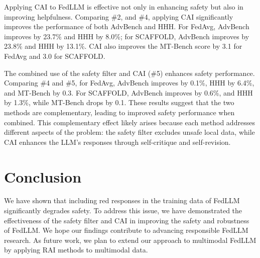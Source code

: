 Applying CAI to FedLLM is effective not only in enhancing safety but also in improving helpfulness.  
Comparing \#2, and \#4, applying CAI significantly improves the performance of both AdvBench and HHH.  
For FedAvg, AdvBench improves by 23.7\% and HHH by 8.0\%; for SCAFFOLD, AdvBench improves by 23.8\% and HHH by 13.1\%. 
CAI also improves the MT-Bench score by 3.1 for FedAvg and 3.0 for SCAFFOLD.


The combined use of the safety filter and CAI (\#5) enhances safety performance.  
Comparing \#4 and \#5, for FedAvg, AdvBench improves by 0.1\%, HHH by 6.4\%, and MT-Bench by 0.3.  
For SCAFFOLD, AdvBench improves by 0.6\%, and HHH by 1.3\%, while MT-Bench drops by 0.1.
These results suggest that the two methods are complementary, leading to improved safety performance when combined.  
This complementary effect likely arises because each method addresses different aspects of the problem: the safety filter excludes unsafe local data, while CAI enhances the LLM's responses through self-critique and self-revision.


\section{Conclusion}  
We have shown that including red responses in the training data of FedLLM significantly degrades safety.
To address this issue, we have demonstrated the effectiveness of the safety filter and CAI in improving the safety and robustness of FedLLM.
We hope our findings contribute to advancing responsible FedLLM research.
As future work, we plan to extend our approach to multimodal FedLLM by applying RAI methods to multimodal data.